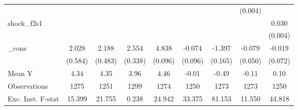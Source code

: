 {\begin{tabular}{l*{8}{c}}
            &                     &                     &                     &                     &                     &                     &     (0.004)         &                     \\
\addlinespace
shock\_f2s1  &                     &                     &                     &                     &                     &                     &                     &       0.030\sym{***}\\
            &                     &                     &                     &                     &                     &                     &                     &     (0.004)         \\
\addlinespace
\_cons      &       2.028\sym{***}&       2.188\sym{***}&       2.554\sym{***}&       4.838\sym{***}&      -0.074         &      -1.397\sym{***}&      -0.079         &      -0.019         \\
            &     (0.584)         &     (0.483)         &     (0.338)         &     (0.096)         &     (0.096)         &     (0.165)         &     (0.050)         &     (0.072)         \\
\midrule
Mean Y      &        4.34         &        4.35         &        3.96         &        4.46         &       -0.01         &       -0.49         &       -0.11         &        0.10         \\
Observations&        1275         &        1251         &        1299         &        1274         &        1250         &        1273         &        1273         &        1250         \\
Exc. Inst. F-stat&      15.399         &      21.755         &       0.238         &      24.942         &      33.375         &      81.153         &      11.550         &      44.818         \\
\bottomrule
\end{tabular}
}
